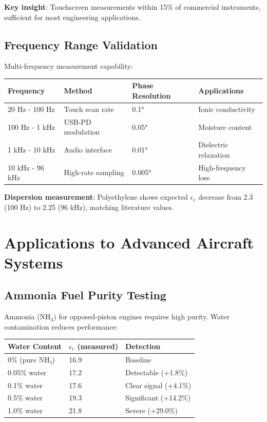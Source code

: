 \documentclass[12pt,a4paper]{article}
\begin{document}
\textbf{Key insight}: Touchscreen measurements within 15\% of commercial instruments, sufficient for most engineering applications.

\subsection{Frequency Range Validation}

Multi-frequency measurement capability:

\begin{center}
\begin{tabular}{|l|l|l|l|}
\hline
\textbf{Frequency} & \textbf{Method} & \textbf{Phase Resolution} & \textbf{Applications} \\
\hline
20 Hz - 100 Hz & Touch scan rate & 0.1° & Ionic conductivity \\
100 Hz - 1 kHz & USB-PD modulation & 0.05° & Moisture content \\
1 kHz - 10 kHz & Audio interface & 0.01° & Dielectric relaxation \\
10 kHz - 96 kHz & High-rate sampling & 0.005° & High-frequency loss \\
\hline
\end{tabular}
\end{center}

\textbf{Dispersion measurement}: Polyethylene shows expected $\epsilon_r$ decrease from 2.3 (100 Hz) to 2.25 (96 kHz), matching literature values.

\section{Applications to Advanced Aircraft Systems}

\subsection{Ammonia Fuel Purity Testing}

Ammonia ($\text{NH}_3$) for opposed-piston engines requires high purity. Water contamination reduces performance:

\begin{center}
\begin{tabular}{|l|l|l|}
\hline
\textbf{Water Content} & \textbf{$\epsilon_r$ (measured)} & \textbf{Detection} \\
\hline
0\% (pure NH₃) & 16.9 & Baseline \\
0.05\% water & 17.2 & Detectable (+1.8\%) \\
0.1\% water & 17.6 & Clear signal (+4.1\%) \\
0.5\% water & 19.3 & Significant (+14.2\%) \\
1.0\% water & 21.8 & Severe (+29.0\%) \\
\hline
\end{tabular}
\end{center}
\end{document}
